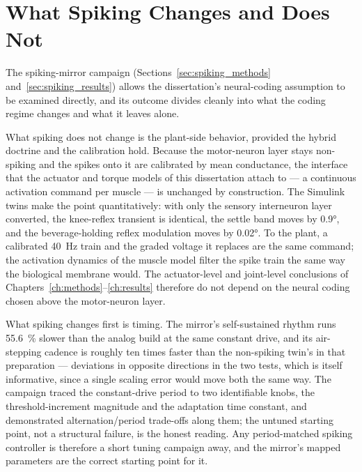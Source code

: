 \section{What Spiking Changes and Does Not}\label{sec:disc_spiking}

The spiking-mirror campaign (Sections~\ref{sec:spiking_methods} and~\ref{sec:spiking_results}) allows the dissertation's neural-coding assumption to be examined directly, and its outcome divides cleanly into what the coding regime changes and what it leaves alone.

What spiking does not change is the plant-side behavior, provided the hybrid doctrine and the calibration hold. Because the motor-neuron layer stays non-spiking and the spikes onto it are calibrated by mean conductance, the interface that the actuator and torque models of this dissertation attach to --- a continuous activation command per muscle --- is unchanged by construction. The Simulink twins make the point quantitatively: with only the sensory interneuron layer converted, the knee-reflex transient is identical, the settle band moves by \ang{0.9}, and the beverage-holding reflex modulation moves by \ang{0.02}. To the plant, a calibrated \qty{40}{\hertz} train and the graded voltage it replaces are the same command; the activation dynamics of the muscle model filter the spike train the same way the biological membrane would. The actuator-level and joint-level conclusions of Chapters~\ref{ch:methods}--\ref{ch:results} therefore do not depend on the neural coding chosen above the motor-neuron layer.

What spiking changes first is timing. The mirror's self-sustained rhythm runs \qty{55.6}{\percent} slower than the analog build at the same constant drive, and its air-stepping cadence is roughly ten times faster than the non-spiking twin's in that preparation --- deviations in opposite directions in the two tests, which is itself informative, since a single scaling error would move both the same way. The campaign traced the constant-drive period to two identifiable knobs, the threshold-increment magnitude and the adaptation time constant, and demonstrated alternation/period trade-offs along them; the untuned starting point, not a structural failure, is the honest reading. Any period-matched spiking controller is therefore a short tuning campaign away, and the mirror's mapped parameters are the correct starting point for it.


